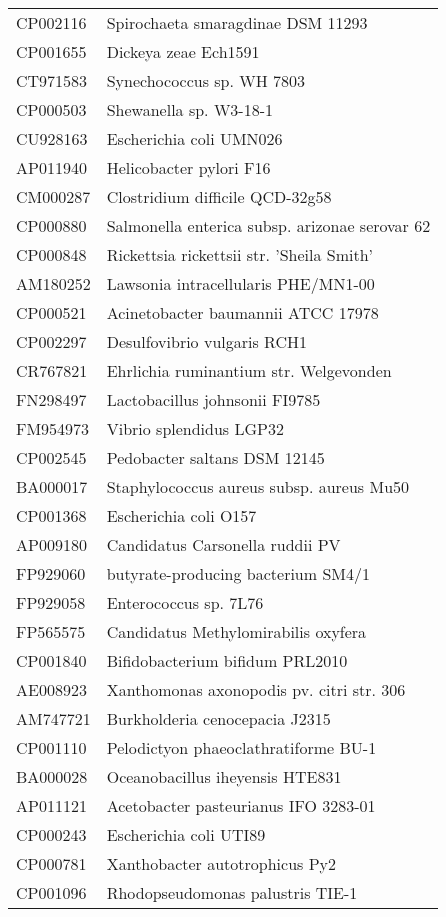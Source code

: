 \begin{longtable}{ll}
CP002116 & Spirochaeta smaragdinae DSM 11293\\
CP001655 & Dickeya zeae Ech1591\\
CT971583 & Synechococcus sp. WH 7803\\
CP000503 & Shewanella sp. W3-18-1\\
CU928163 & Escherichia coli UMN026\\
AP011940 & Helicobacter pylori F16\\
CM000287 & Clostridium difficile QCD-32g58\\
CP000880 & Salmonella enterica subsp. arizonae serovar 62\\
CP000848 & Rickettsia rickettsii str. 'Sheila Smith'\\
AM180252 & Lawsonia intracellularis PHE/MN1-00\\
CP000521 & Acinetobacter baumannii ATCC 17978\\
CP002297 & Desulfovibrio vulgaris RCH1\\
CR767821 & Ehrlichia ruminantium str. Welgevonden\\
FN298497 & Lactobacillus johnsonii FI9785\\
FM954973 & Vibrio splendidus LGP32\\
CP002545 & Pedobacter saltans DSM 12145\\
BA000017 & Staphylococcus aureus subsp. aureus Mu50\\
CP001368 & Escherichia coli O157\\
AP009180 & Candidatus Carsonella ruddii PV\\
FP929060 & butyrate-producing bacterium SM4/1\\
FP929058 & Enterococcus sp. 7L76\\
FP565575 & Candidatus Methylomirabilis oxyfera\\
CP001840 & Bifidobacterium bifidum PRL2010\\
AE008923 & Xanthomonas axonopodis pv. citri str. 306\\
AM747721 & Burkholderia cenocepacia J2315\\
CP001110 & Pelodictyon phaeoclathratiforme BU-1\\
BA000028 & Oceanobacillus iheyensis HTE831\\
AP011121 & Acetobacter pasteurianus IFO 3283-01\\
CP000243 & Escherichia coli UTI89\\
CP000781 & Xanthobacter autotrophicus Py2\\
CP001096 & Rhodopseudomonas palustris TIE-1\\

\end{longtable}
